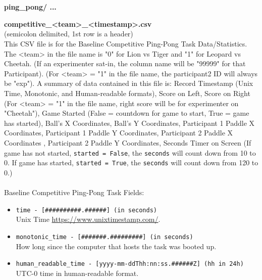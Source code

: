 \begin{description}
\begin{addmargin}[0em]{0em}
    \end{addmargin} %


    \textbf{\\\\}
    \begin{addmargin}[0em]{0em} %
        \textbf{ping\_pong/ ...}

        \begin{addmargin}[1em]{0em} %
            \textbf{competitive\_<team>\_<timestamp>.csv}\\(semicolon delimited, 1st row is a header)\\
            This CSV file is for the Baseline Competitive Ping-Pong Task Data/Statistics.
            The <team> in the file name is "0" for Lion vs Tiger and "1" for Leopard vs Cheetah.
            (If an experimenter sat-in, the column name will be "99999" for that Participant).
            (For <team> = "1" in the file name, the participant2 ID will always be "exp").
            A summary of data contained in this file is: Record Timestamp (Unix Time, Monotonic, and Human-readable formats),
            Score on Left, Score on Right (For <team> = "1" in the file name, right score will be for experimenter on "Cheetah"), Game Started (False = countdown for game to start, True = game has started),
            Ball's X Coordinates, Ball's Y Coordinates, Participant 1 Paddle X Coordinates, Participant 1 Paddle Y Coordinates,
            Participant 2 Paddle X Coordinates , Participant 2 Paddle Y Coordinates, Seconds Timer on Screen (If game has not started, \verb|started = False|,
            the \verb|seconds| will count down from 10 to 0. If game has started, \verb|started = True|, the \verb|seconds| will count down from 120 to 0.)\\\\
            Baseline Competitive Ping-Pong Task Fields:
            \begin{itemize}
                \item \verb|time - [##########.######] (in seconds)|\\Unix Time \href{https://www.unixtimestamp.com/}{https://www.unixtimestamp.com/}.
                \item \verb|monotonic_time - [#######.#########] (in seconds)|\\How long since the computer that hosts the task was booted up.
                \item \verb|human_readable_time - [yyyy-mm-ddThh:nn:ss.######Z] (hh in 24h)|\\ UTC-0 time in human-readable format.

\end{itemize}
\end{addmargin}
\end{addmargin}
\end{description}
